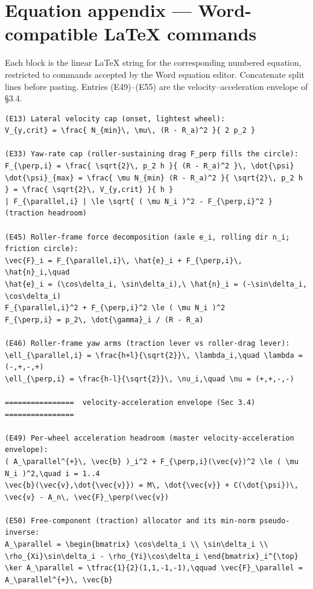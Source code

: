 \documentclass[11pt]{article}
\begin{document}
\appendix
\section{Equation appendix --- Word-compatible \LaTeX{} commands}
Each block is the linear \LaTeX{} string for the corresponding numbered equation, restricted to
commands accepted by the Word equation editor. Concatenate split lines before pasting. Entries
(E49)--(E55) are the velocity--acceleration envelope of \S3.4.

\begin{lstlisting}
(E13) Lateral velocity cap (onset, lightest wheel):
V_{y,crit} = \frac{ N_{min}\, \mu\, (R - R_a)^2 }{ 2 p_2 }

(E33) Yaw-rate cap (roller-sustaining drag F_perp fills the circle):
F_{\perp,i} = \frac{ \sqrt{2}\, p_2 h }{ (R - R_a)^2 }\, \dot{\psi}
\dot{\psi}_{max} = \frac{ \mu N_{min} (R - R_a)^2 }{ \sqrt{2}\, p_2 h } = \frac{ \sqrt{2}\, V_{y,crit} }{ h }
| F_{\parallel,i} | \le \sqrt{ ( \mu N_i )^2 - F_{\perp,i}^2 }   (traction headroom)

(E45) Roller-frame force decomposition (axle e_i, rolling dir n_i; friction circle):
\vec{F}_i = F_{\parallel,i}\, \hat{e}_i + F_{\perp,i}\, \hat{n}_i,\quad
\hat{e}_i = (\cos\delta_i, \sin\delta_i),\ \hat{n}_i = (-\sin\delta_i, \cos\delta_i)
F_{\parallel,i}^2 + F_{\perp,i}^2 \le ( \mu N_i )^2
F_{\perp,i} = p_2\, \dot{\gamma}_i / (R - R_a)

(E46) Roller-frame yaw arms (traction lever vs roller-drag lever):
\ell_{\parallel,i} = \frac{h+l}{\sqrt{2}}\, \lambda_i,\quad \lambda = (-,+,-,+)
\ell_{\perp,i} = \frac{h-l}{\sqrt{2}}\, \nu_i,\quad \nu = (+,+,-,-)

================  velocity-acceleration envelope (Sec 3.4)  ================

(E49) Per-wheel acceleration headroom (master velocity-acceleration envelope):
( A_\parallel^{+}\, \vec{b} )_i^2 + F_{\perp,i}(\vec{v})^2 \le ( \mu N_i )^2,\quad i = 1..4
\vec{b}(\vec{v},\dot{\vec{v}}) = M\, \dot{\vec{v}} + C(\dot{\psi})\, \vec{v} - A_n\, \vec{F}_\perp(\vec{v})

(E50) Free-component (traction) allocator and its min-norm pseudo-inverse:
A_\parallel = \begin{bmatrix} \cos\delta_i \\ \sin\delta_i \\ \rho_{Xi}\sin\delta_i - \rho_{Yi}\cos\delta_i \end{bmatrix}_i^{\top}
\ker A_\parallel = \tfrac{1}{2}(1,1,-1,-1),\qquad \vec{F}_\parallel = A_\parallel^{+}\, \vec{b}


\end{lstlisting}
\end{document}
